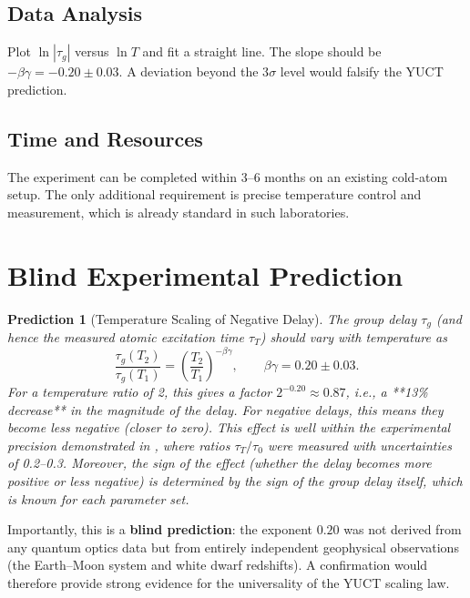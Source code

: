 \documentclass[12pt,a4paper]{article}
\newcommand{\betagamma}{\beta\gamma}
\newtheorem{prediction}{Prediction}
\begin{document}
	\subsection{Data Analysis}
	Plot \(\ln |\tau_g|\) versus \(\ln T\) and fit a straight line. The slope should be \(-\betagamma = -0.20 \pm 0.03\). A deviation beyond the 3\(\sigma\) level would falsify the YUCT prediction.
	
	\subsection{Time and Resources}
	The experiment can be completed within 3–6 months on an existing cold-atom setup. The only additional requirement is precise temperature control and measurement, which is already standard in such laboratories.
	
	\section{Blind Experimental Prediction}
	
	\begin{prediction}[Temperature Scaling of Negative Delay]
		The group delay \(\tau_g\) (and hence the measured atomic excitation time \(\tau_T\)) should vary with temperature as
		\begin{equation}
			\frac{\tau_g(T_2)}{\tau_g(T_1)} = \left(\frac{T_2}{T_1}\right)^{-\betagamma}, \qquad \betagamma = 0.20 \pm 0.03.
			\label{eq:predict}
		\end{equation}
		For a temperature ratio of 2, this gives a factor \(2^{-0.20} \approx 0.87\), i.e., a **13\% decrease** in the magnitude of the delay. For negative delays, this means they become less negative (closer to zero). This effect is well within the experimental precision demonstrated in \cite{Angulo2024}, where ratios \(\tau_T/\tau_0\) were measured with uncertainties of 0.2–0.3. Moreover, the sign of the effect (whether the delay becomes more positive or less negative) is determined by the sign of the group delay itself, which is known for each parameter set.
	\end{prediction}
	
	Importantly, this is a \textbf{blind prediction}: the exponent \(0.20\) was not derived from any quantum optics data but from entirely independent geophysical observations (the Earth–Moon system and white dwarf redshifts). A confirmation would therefore provide strong evidence for the universality of the YUCT scaling law.
	
\end{document}
